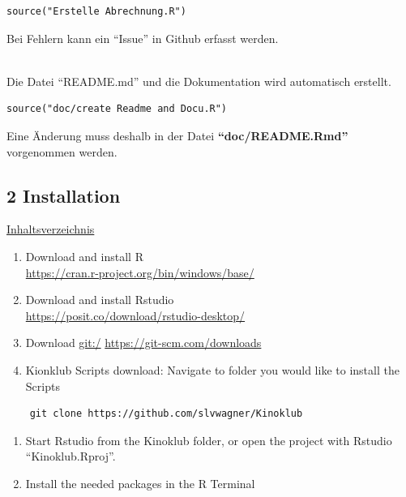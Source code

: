 \documentclass[
]{article}
\providecommand{\tightlist}{%
  \setlength{\itemsep}{0pt}\setlength{\parskip}{0pt}}
\begin{document}
\begin{verbatim}
source("Erstelle Abrechnung.R")
\end{verbatim}

\hfill\break
Bei Fehlern kann ein ``Issue'' in Github erfasst werden.\\
\strut \\
Die Datei ``README.md'' und die Dokumentation wird automatisch erstellt.

\begin{verbatim}
source("doc/create Readme and Docu.R")
\end{verbatim}

Eine Änderung muss deshalb in der Datei \textbf{``doc/README.Rmd''}
vorgenommen werden.

\newpage

\subsection{2 Installation}\label{installation}

\hyperref[Inhaltsverzeichnis]{Inhaltsverzeichnis}

\begin{enumerate}
\def\labelenumi{\arabic{enumi}.}
\tightlist
\item
  Download and install R\\
  \url{https://cran.r-project.org/bin/windows/base/}
\item
  Download and install Rstudio\\
  \url{https://posit.co/download/rstudio-desktop/}
\item
  Download \url{git:/} \url{https://git-scm.com/downloads}
\item
  Kionklub Scripts download: Navigate to folder you would like to
  install the Scripts
\end{enumerate}

\begin{verbatim}
    git clone https://github.com/slvwagner/Kinoklub
\end{verbatim}

\begin{enumerate}
\def\labelenumi{\arabic{enumi}.}
\setcounter{enumi}{5}
\tightlist
\item
  Start Rstudio from the Kinoklub folder, or open the project with
  Rstudio ``Kinoklub.Rproj''.
\item
  Install the needed packages in the R Terminal
\end{enumerate}
\end{document}
